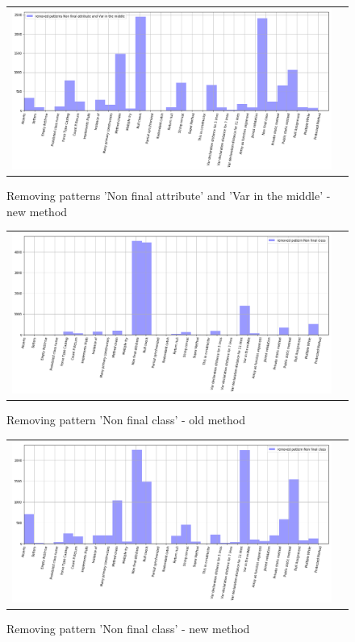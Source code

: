 \documentclass[12pt]{article}
\begin{document}
\begin{figure}[h!]\center
	\begin{tabular}{cc}
		\includegraphics[scale=0.4]{2-1.png}
	\end{tabular}
	\caption{Removing patterns 'Non final attribute' and 'Var in the middle' - new method}
	\label{fig:ris4}
\end{figure}
\newpage
\begin{figure}[h!]\center
	\begin{tabular}{cc}
		\includegraphics[scale=0.4]{3-2.png}
	\end{tabular}
	\caption{Removing pattern 'Non final class' - old method}
	\label{fig:ris5}
\end{figure}
\begin{figure}[h!]\center
	\begin{tabular}{cc}
		\includegraphics[scale=0.4]{3-1.png}
	\end{tabular}
	\caption{Removing pattern 'Non final class' - new method}
	\label{fig:ris6}
\end{figure}
\newpage
\end{document}
